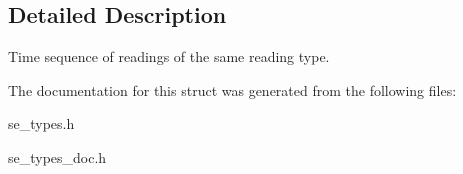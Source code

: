 \subsection{Detailed Description}
Time sequence of readings of the same reading type. 

The documentation for this struct was generated from the following files\+:\begin{DoxyCompactItemize}
\item 
se\+\_\+types.\+h\item 
se\+\_\+types\+\_\+doc.\+h\end{DoxyCompactItemize}

